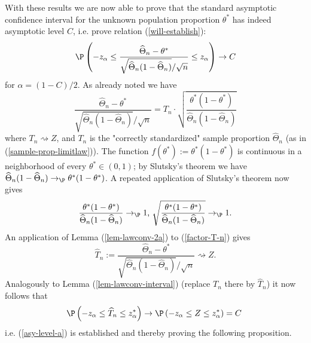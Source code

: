 With these results we are now able to prove that the standard asymptotic confidence
interval for the unknown population proportion $\theta^*$ has indeed asymptotic level $C$, i.e.
prove relation (\ref{will-establish}): 
\begin{equation}
\P \left( -z_{\alpha}\leq \frac{\widehat{\Theta}_{n}-\theta^*}{\sqrt{\widehat{\Theta}_{n}(1-%
\widehat{\Theta}_{n})}/\sqrt{n}}\leq z_{\alpha}\right) \rightarrow C
\label{asy-level-a}
\end{equation}%
for $\alpha =\left( 1-C\right) /2$. As already noted we have 
\begin{equation}
\frac{\widehat{\Theta}_{n}-\theta^*}{\sqrt{\widehat{\Theta}_{n}(1-\widehat{\Theta}_{n})}/\sqrt{n}}=T_{n}\cdot 
\sqrt{\frac{\theta^*(1-\theta^*)}{\widehat{\Theta}_{n}(1-\widehat{\Theta}_{n})}}  \label{factor-T-n}
\end{equation}%
where $T_{n}\rightsquigarrow Z$, and $T_{n}$ is the "correctly standardized"
sample proportion $\widehat{\Theta}_{n}$ (as in (\ref{sample-prop-limitlaw})). The
function $f(\theta^*):=\theta^*(1-\theta^*)$ is continuous in a neighborhood of every $\theta^* \in (0,1)$; by
Slutsky's theorem we have $\widehat{\Theta}_{n}(1-\widehat{\Theta}_{n})\rightarrow _{\P
}\theta^*(1-\theta^*)$. A repeated application of Slutsky's theorem now gives 
\begin{equation*}
\frac{\theta^*(1-\theta^*)}{\widehat{\Theta}_{n}(1-\widehat{\Theta}_{n})}\rightarrow _{\P }1\text{, }\sqrt{%
\frac{\theta^*(1-\theta^*)}{\widehat{\Theta}_{n}(1-\widehat{\Theta}_{n})}}\rightarrow _{\P }1.
\end{equation*}%
An application of Lemma (\ref{lem-lawconv-2a}) to (\ref{factor-T-n}) gives 
\begin{equation*}
\widehat{T}_{n}:=\frac{\widehat{\Theta}_{n}-\theta^*}{\sqrt{\widehat{\Theta}_{n}(1-\widehat{\Theta}_{n})}/\sqrt{n}}%
\rightsquigarrow Z.
\end{equation*}%
Analogously to Lemma (\ref{lem-lawconv-interval}) (replace $T_{n}$ there by $%
\widehat{T}_{n}$) it now follows that 
\begin{equation*}
\P \left( -z_{\alpha}\leq \widehat{T}_{n}\leq z_{\alpha }^{\ast
}\right) \rightarrow \P \left( -z_{\alpha}\leq Z\leq z_{\alpha
}^{\ast }\right) =C\text{ }
\end{equation*}%
i.e. (\ref{asy-level-a}) is established and thereby proving the following proposition.

